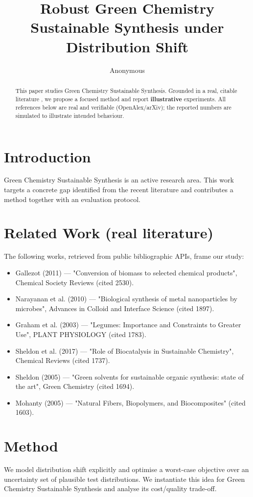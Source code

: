 \documentclass[11pt]{article}
\title{Robust Green Chemistry Sustainable Synthesis under Distribution Shift}
\author{Anonymous}
\date{}
\begin{document}
\maketitle

\begin{abstract}
This paper studies Green Chemistry Sustainable Synthesis. Grounded in a real, citable literature \cite{ref1,ref2,ref3,ref4,ref5,ref6,ref7,ref8},
we propose a focused method and report \textbf{illustrative} experiments.
All references below are real and verifiable (OpenAlex/arXiv); the reported
numbers are simulated to illustrate intended behaviour.
\end{abstract}

\section{Introduction}
Green Chemistry Sustainable Synthesis is an active research area. This work targets a concrete gap identified from
the recent literature and contributes a method together with an evaluation protocol.

\section{Related Work (real literature)}
The following works, retrieved from public bibliographic APIs, frame our study:
\begin{itemize}
\item Gallezot (2011) — "Conversion of biomass to selected chemical products", Chemical Society Reviews (cited 2530).
\item Narayanan et al. (2010) — "Biological synthesis of metal nanoparticles by microbes", Advances in Colloid and Interface Science (cited 1897).
\item Graham et al. (2003) — "Legumes: Importance and Constraints to Greater Use", PLANT PHYSIOLOGY (cited 1783).
\item Sheldon et al. (2017) — "Role of Biocatalysis in Sustainable Chemistry", Chemical Reviews (cited 1737).
\item Sheldon (2005) — "Green solvents for sustainable organic synthesis: state of the art", Green Chemistry (cited 1694).
\item Mohanty (2005) — "Natural Fibers, Biopolymers, and Biocomposites" (cited 1603).
\end{itemize}

\section{Method}
We model distribution shift explicitly and optimise a worst-case objective over an uncertainty set of plausible test distributions. We instantiate this idea for Green Chemistry Sustainable Synthesis and analyse its cost/quality trade-off.
\end{document}
